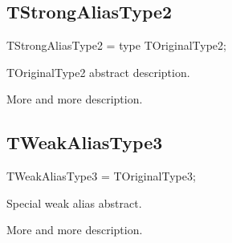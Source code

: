 \documentclass{report}
\newif\ifpdf
\begin{document}
\subsection*{TStrongAliasType2}
\fi
\label{ok_type_aliases-TStrongAliasType2}
\begin{list}{}{
\setlength{\itemindent}{0cm}
\setlength{\listparindent}{0cm}
\setlength{\leftmargin}{\evensidemargin}
\addtolength{\leftmargin}{\tmplength}
\settowidth{\labelsep}{X}
\addtolength{\leftmargin}{\labelsep}
\setlength{\labelwidth}{\tmplength}
}
\item[\textbf{Declaration}\hfill]
\ifpdf
\begin{flushleft}
\fi
\begin{ttfamily}
TStrongAliasType2 = type TOriginalType2;\end{ttfamily}

\ifpdf
\end{flushleft}
\fi

\par
\item[\textbf{Description}]
TOriginalType2 abstract description.\hfill\vspace*{1ex}

 More and more description.

\end{list}
\ifpdf
\subsection*{\large{\textbf{TWeakAliasType3}}\normalsize\hspace{1ex}\hrulefill}
\else
\subsection*{TWeakAliasType3}
\fi
\label{ok_type_aliases-TWeakAliasType3}
\begin{list}{}{
\setlength{\itemindent}{0cm}
\setlength{\listparindent}{0cm}
\setlength{\leftmargin}{\evensidemargin}
\addtolength{\leftmargin}{\tmplength}
\settowidth{\labelsep}{X}
\addtolength{\leftmargin}{\labelsep}
\setlength{\labelwidth}{\tmplength}
}
\item[\textbf{Declaration}\hfill]
\ifpdf
\begin{flushleft}
\fi
\begin{ttfamily}
TWeakAliasType3 = TOriginalType3;\end{ttfamily}

\ifpdf
\end{flushleft}
\fi

\par
\item[\textbf{Description}]
Special weak alias abstract.\hfill\vspace*{1ex}

 More and more description.

\end{list}
\ifpdf
\end{document}
